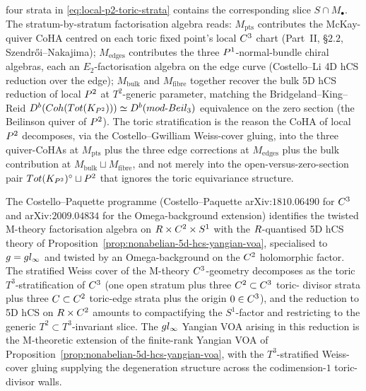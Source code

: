 \begin{example}
four strata in \eqref{eq:local-p2-toric-strata} contains the
corresponding slice $S \cap M_\bullet$. The stratum-by-stratum
factorisation algebra reads: $M_{\mathrm{pts}}$ contributes the
McKay-quiver CoHA centred on each toric fixed point's local $C^3$
chart (Part~II, \S$2.2$, Szendr\H{o}i--Nakajima); $M_{\mathrm{edges}}$
contributes the three $P^1$-normal-bundle chiral algebras, each an
$E_2$-factorisation algebra on the edge curve (Costello--Li
\cite{CostelloLi2016} 4D hCS reduction over the edge); $M_{\mathrm{bulk}}$
and $M_{\mathrm{fibre}}$ together recover the bulk 5D hCS reduction of
local $P^2$ at $T^2$-generic parameter, matching the
Bridgeland--King--Reid $D^b(Coh(Tot(K_{P^2}))) \simeq
D^b(mod\text{-}Beil_3)$ equivalence on the zero section
(the Beilinson quiver of $P^2$).
The toric stratification is the reason the CoHA of local $P^2$
decomposes, via the Costello--Gwilliam Weiss-cover gluing, into the
three quiver-CoHAs at $M_{\mathrm{pts}}$ plus the three edge
corrections at $M_{\mathrm{edges}}$ plus the bulk contribution at
$M_{\mathrm{bulk}} \sqcup M_{\mathrm{fibre}}$, and not merely into the
open-versus-zero-section pair $Tot(K_{P^2})^\circ \sqcup P^2$ that
ignores the toric equivariance structure.
\end{example}

\begin{remark}
\label{rem:costello-paquette-c3-m-theory}
The Costello--Paquette programme (Costello--Paquette arXiv:$1810.06490$
for $C^3$ and arXiv:$2009.04834$ for the Omega-background extension)
identifies the twisted M-theory factorisation algebra on $R \times
C^2 \times S^1$ with the $R$-quantised 5D hCS theory of
Proposition~\ref{prop:nonabelian-5d-hcs-yangian-voa}, specialised to
$g = gl_\infty$ and twisted by an Omega-background on
the $C^2$ holomorphic factor. The stratified Weiss cover of the
M-theory $C^3$-geometry decomposes as the toric $T^3$-stratification
of $C^3$ (one open stratum plus three $C^2 \subset C^3$ toric-
divisor strata plus three $C \subset C^2$ toric-edge strata plus the
origin $0 \in C^3$), and the reduction to 5D hCS on $R \times C^2$
amounts to compactifying the $S^1$-factor and restricting to the
generic $T^2 \subset T^3$-invariant slice. The $gl_\infty$
Yangian VOA arising in this reduction is the M-theoretic extension of
the finite-rank Yangian VOA of
Proposition~\ref{prop:nonabelian-5d-hcs-yangian-voa}, with the
$T^3$-stratified Weiss-cover gluing supplying the degeneration
structure across the codimension-$1$ toric-divisor walls.
\end{remark}

